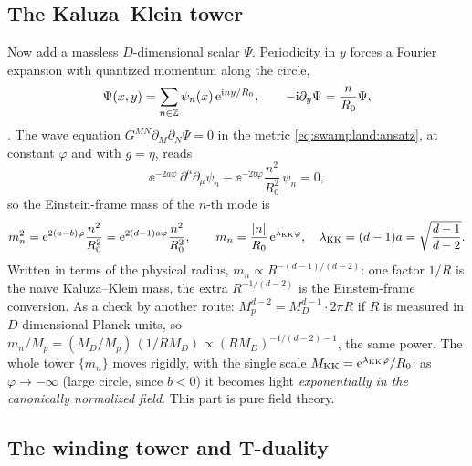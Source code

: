 \subsection{The Kaluza--Klein tower}

Now add a massless $D$-dimensional scalar $\Psi$. Periodicity in $y$ forces a Fourier expansion
with quantized momentum along the circle,
\[
\Psi(x,y)=\sum_{n\in\mathbb{Z}}\psi_n(x)\,\mathrm{e}^{\mathrm{i} ny/R_0},\qquad -\mathrm{i}\partial_y\Psi=\frac{n}{R_0}\Psi ,
\]
. The wave equation $G^{MN}\partial_M\partial_N\Psi=0$ in the
metric \eqref{eq:swampland:ansatz}, at constant $\varphi$ and with $g=\eta$, reads
\[
\ee^{-2a\varphi}\,\partial^\mu\partial_\mu\psi_n-\ee^{-2b\varphi}\frac{n^2}{R_0^2}\,\psi_n=0 ,
\]
so the Einstein-frame mass of the $n$-th mode is
\begin{equation}\label{eq:swampland:mkk}
m_n^2=\mathrm{e}^{2(a-b)\varphi}\frac{n^2}{R_0^2}=\mathrm{e}^{2(d-1)a\varphi}\frac{n^2}{R_0^2},
\qquad
m_n=\frac{|n|}{R_0}\,\mathrm{e}^{\lambda_{\rm KK}\varphi},\quad
\lambda_{\rm KK}=(d-1)a=\sqrt{\frac{d-1}{d-2}} .
\end{equation}
Written in terms of the physical radius, $m_n\propto R^{-(d-1)/(d-2)}$: one factor $1/R$ is the
naive Kaluza--Klein mass, the extra $R^{-1/(d-2)}$ is the Einstein-frame conversion. As a check by
another route: $M_p^{d-2}=M_D^{d-1}\cdot2\pi R$ if $R$ is measured in $D$-dimensional Planck units,
so $m_n/M_p=(M_D/M_p)\,(1/RM_D)\propto(RM_D)^{-1/(d-2)-1}$, the same power. The whole tower
$\{m_n\}$ moves rigidly, with the single scale $M_{\rm KK}=\mathrm{e}^{\lambda_{\rm KK}\varphi}/R_0$: as
$\varphi\to-\infty$ (large circle, since $b<0$) it becomes light \emph{exponentially in the
canonically normalized field}. This part is pure field theory.

\subsection{The winding tower and T-duality}

